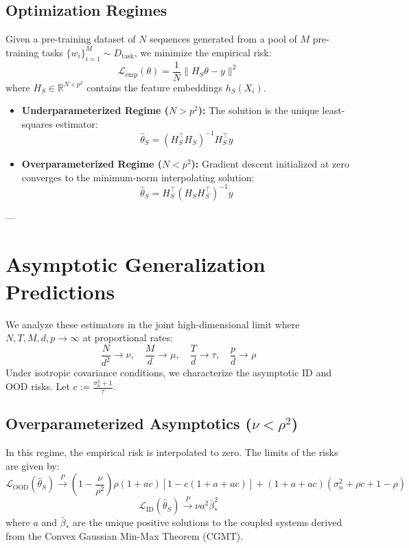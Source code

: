 \documentclass[11pt,a4paper]{article}
\begin{document}
\subsection{Optimization Regimes}
Given a pre-training dataset of $N$ sequences generated from a pool of $M$ pre-training tasks $\{w_i\}_{i=1}^M \sim D_{\text{task}}$, we minimize the empirical risk:
\begin{equation}
    \mathcal{L}_{\text{emp}}(\theta) = \frac{1}{N} \| H_S \theta - y \|^2
\end{equation}
where $H_S \in \mathbb{R}^{N \times p^2}$ contains the feature embeddings $h_S(X_i)$.
\begin{itemize}
    \item \textbf{Underparameterized Regime ($N > p^2$):} The solution is the unique least-squares estimator:
    \begin{equation}
        \hat{\theta}_S = \left( H_S^\top H_S \right)^{-1} H_S^\top y
    \end{equation}
    \item \textbf{Overparameterized Regime ($N < p^2$):} Gradient descent initialized at zero converges to the minimum-norm interpolating solution:
    \begin{equation}
        \hat{\theta}_S = H_S^\top \left( H_S H_S^\top \right)^{-1} y
    \end{equation}
\end{itemize}

---

\section{Asymptotic Generalization Predictions}
We analyze these estimators in the joint high-dimensional limit where $N, T, M, d, p \to \infty$ at proportional rates:
\begin{equation}
    \frac{N}{d^2} \to \nu, \quad \frac{M}{d} \to \mu, \quad \frac{T}{d} \to \tau, \quad \frac{p}{d} \to \rho
\end{equation}
Under isotropic covariance conditions, we characterize the asymptotic ID and OOD risks. Let $c := \frac{\sigma_n^2 + 1}{\tau}$.

\subsection{Overparameterized Asymptotics ($\nu < \rho^2$)}
In this regime, the empirical risk is interpolated to zero. The limits of the risks are given by:
\begin{equation}
    \mathcal{L}_{\text{OOD}}(\hat{\theta}_S) \xrightarrow{P} \left(1 - \frac{\nu}{\rho^2}\right) \rho (1 + a c) \left[ 1 - c(1 + a + a c) \right] + (1 + a + a c)(\sigma_n^2 + \rho c + 1 - \rho)
\end{equation}
\begin{equation}
    \mathcal{L}_{\text{ID}}(\hat{\theta}_S) \xrightarrow{P} \nu a^2 \bar{\beta}_*^2
\end{equation}
where $a$ and $\bar{\beta}_*$ are the unique positive solutions to the coupled systems derived from the Convex Gaussian Min-Max Theorem (CGMT).
\end{document}
